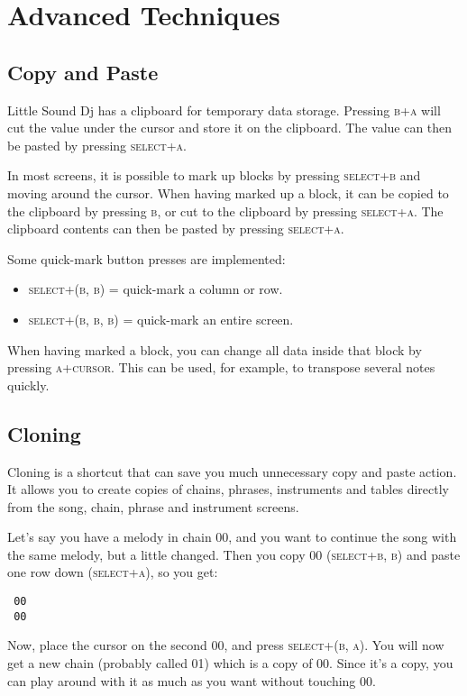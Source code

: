 \chapter{Advanced Techniques}

\section{Copy and Paste} \label{copy-paste}

Little Sound Dj has a clipboard for temporary data storage. Pressing \textsc{b+a} will cut the value
under the cursor and store it on the clipboard. The value can then be pasted by pressing
\textsc{select+a}.

In most screens, it is possible to mark up blocks by pressing \textsc{select+b} and moving around
the cursor. When having marked up a block, it can be copied to the clipboard by pressing \textsc{b},
or cut to the clipboard by pressing \textsc{select+a}. The clipboard contents can then be pasted by
pressing \textsc{select+a}.

Some quick-mark button presses are implemented:
\begin{itemize}
\item \textsc{select+(b, b)} = quick-mark a column or row.
\item \textsc{select+(b, b, b)} = quick-mark an entire screen.
\end{itemize}

When having marked a block, you can change all data inside that block by pressing \textsc{a+cursor}. This can be used, for example, to transpose several notes quickly.

\section{Cloning}

Cloning is a shortcut that can save you much unnecessary copy and paste action. It allows you to create copies of chains, phrases, instruments and tables directly from the song, chain, phrase and instrument screens.

Let's say you have a melody in chain 00, and you want to continue the song with the same melody, but a little changed. Then you copy 00 \textsc{(select+b, b)} and paste one row down \textsc{(select+a)}, so you get:

\begin{verbatim}
 00 
 00 
\end{verbatim}

Now, place the cursor on the second 00, and press \textsc{select+(b, a)}.
You will now get a new chain (probably called 01) which is a copy of 00. Since it's a copy, you can play around with it as much as you want without touching 00.

